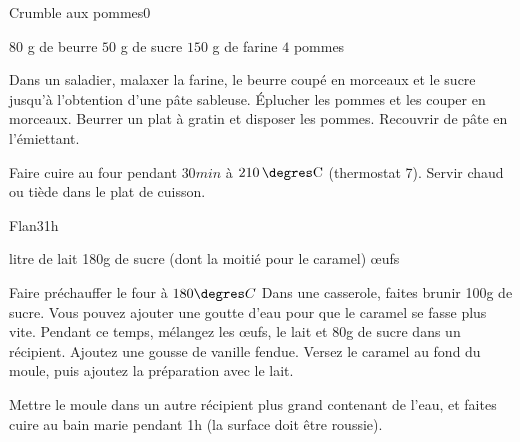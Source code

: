 \begin{recette}{Crumble aux pommes}{0}{}{}
\begin{ingredients}[4 pers.]
\ingredient $80$ g de beurre
\ingredient $50$ g de sucre
\ingredient $150$ g de farine
\ingredient $4$ pommes
\end{ingredients}

\begin{preparation}
\etape Dans un saladier, malaxer la farine, le beurre coupé en morceaux et le sucre jusqu'à l'obtention d'une pâte sableuse.
\etape Éplucher les pommes et les couper en morceaux.
\etape Beurrer un plat à gratin et disposer les pommes.
\etape Recouvrir de pâte en l'émiettant.
\end{preparation}

\begin{cuisson}
Faire cuire au four pendant $30\unit{min}$ à $210\unit{\degres C}$ (thermostat 7). Servir chaud ou tiède dans le plat de cuisson.
\end{cuisson}

\end{recette}

\begin{recette}{Flan}{3}{}{1h}
\begin{ingredients}
 litre de lait
\ingredient 180g de sucre (dont la moitié pour le caramel)
 œufs
\end{ingredients}

\begin{preparation}
\etape Faire préchauffer le four à $180\degres C$
\etape Dans une casserole, faites brunir 100g de sucre. Vous pouvez ajouter une goutte d'eau pour que le caramel se fasse plus vite.
\etape Pendant ce temps, mélangez les œufs, le lait et 80g de sucre dans un récipient. Ajoutez une gousse de vanille fendue.
\etape Versez le caramel au fond du moule, puis ajoutez la préparation avec le lait.
\end{preparation}

\begin{cuisson}
Mettre le moule dans un autre récipient plus grand contenant de l'eau, et faites cuire au bain marie pendant 1h (la surface doit être roussie).
\end{cuisson}
\end{recette}

